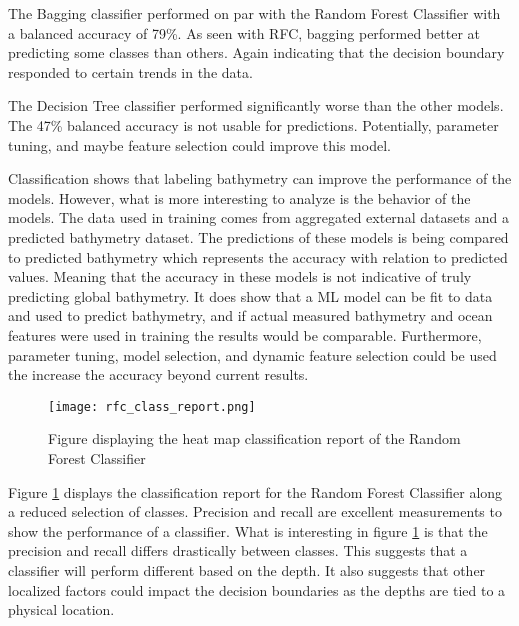 \par
The Bagging classifier performed on par with the Random Forest Classifier with a balanced accuracy of 79\%.
As seen with \ac{RFC}, bagging performed better at predicting some classes than others.
Again indicating that the decision boundary responded to certain trends in the data.

\par
The Decision Tree classifier performed significantly worse than the other models.
The 47\% balanced accuracy is not usable for predictions.
Potentially, parameter tuning, and maybe feature selection could improve this model.

\par
Classification shows that labeling bathymetry can improve the performance of the models.
However, what is more interesting to analyze is the behavior of the models.
The data used in training comes from aggregated external datasets and a predicted bathymetry dataset.
The predictions of these models is being compared to predicted bathymetry which represents the accuracy with relation to predicted values.
Meaning that the accuracy in these models is not indicative of truly predicting global bathymetry.
It does show that a \ac{ML} model can be fit to data and used to predict bathymetry, and if actual measured bathymetry and ocean features were used in training the results would be comparable.
Furthermore, parameter tuning, model selection, and dynamic feature selection could be used the increase the accuracy beyond current results.

\begin{figure}[hb]
    \centering
    \texttt{[image: rfc\_class\_report.png]}
    \caption{Figure displaying the heat map classification report of the Random Forest Classifier}
    \label{fig:rfc_report}
\end{figure}

\par
Figure \ref{fig:rfc_report} displays the classification report for the Random Forest Classifier along a reduced selection of classes.
Precision and recall are excellent measurements to show the performance of a classifier.
What is interesting in figure \ref{fig:rfc_report} is that the precision and recall differs drastically between classes.
This suggests that a classifier will perform different based on the depth.
It also suggests that other localized factors could impact the decision boundaries as the depths are tied to a physical location.

